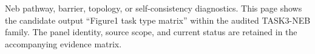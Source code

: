 Neb pathway, barrier, topology, or self-consistency diagnostics. This page shows the candidate output ``Figure1 task type matrix'' within the audited TASK3-NEB family. The panel identity, source scope, and current status are retained in the accompanying evidence matrix.
